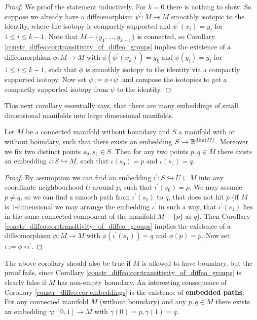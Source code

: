 \begin{proof}
    We proof the statement inductively. For $k=0$ there is nothing to show. So suppose we already have a diffeomorphism $\psi^\prime \colon M \to M$ smoothly isotopic to the identity, where the isotopy is compactly supported and $\psi^\prime(x_i) = y_i$ for $1 \leq i \leq k-1$. Note that $M - \{y_1,\ldots,y_{k-1}\}$ is connected, so Corollary \ref{constr_diffeo:cor:transitivity_of_diffeo_groups} implies the existence of a diffeomorphism $\phi \colon M \to M$ with $\phi(\psi^\prime(x_k)) = y_k$ and $\phi(y_i) = y_i$ for $1 \leq i \leq k-1$, such that $\phi$ is smoothly isotopy to the identity via a compactly supported isotopy. Now set $\psi := \phi \circ \psi^\prime$ and compose the isotopies to get a compactly supported isotopy from $\psi$ to the identity.
\end{proof}

This next corollary essentially says, that there are many embeddings of small dimensional manifolds into large dimensional manifolds.

\begin{corollary}
    \label{constr_diffeo:cor:embeddings}
    Let $M$ be a connected manifold without boundary and $S$ a manifold with or without boundary, such that there exists an embedding $S \hookrightarrow \mathbb{R}^{\mathrm{dim}(M)}$. Moreover we fix two distinct points $s_0,s_1 \in S$. Then for any two points $p,q \in M$ there exists an embedding $\iota \colon S \hookrightarrow M$, such that $\iota(s_0) = p$ and $\iota(s_1) = q$.
\end{corollary}

\begin{proof}
    By assumption we can find an embedding $\iota^\prime \colon S \hookrightarrow U \subseteq M$ into any coordinate neighbourhood $U$ around $p$, such that $\iota^\prime(s_0) = p$. We may assume $ p \neq q$, so we can find a smooth path from $\iota^\prime(s_1)$ to $q$, that does not hit $p$ (if $M$ is $1$-dimensional we may arrange the embedding $\iota^\prime$ in such a way, that $\iota^\prime(s_1)$ lies in the same connected component of the manifold $M - \{p\}$ as $q$). Then Corollary \ref{constr_diffeo:cor:transitivity_of_diffeo_groups} implies the existence of a diffeomorphism $\phi \colon M \to M$ with $\phi(\iota^\prime(s_1)) = q$ and $\phi(p) = p$. Now set $\iota := \phi \circ \iota^\prime$.
\end{proof}

The above corollary should also be true if $M$ is allowed to have boundary, but the proof fails, since Corollary \ref{constr_diffeo:cor:transitivity_of_diffeo_groups} is clearly false if $M$ has non-empty boundary. An interesting consequence of Corollary \ref{constr_diffeo:cor:embeddings} is the existence of \textbf{embedded paths}: For any connected manifold $M$ (without boundary) and any $p,q \in M$ there exists an embedding $\gamma \colon [0,1] \to M$ with $\gamma(0) = p, \gamma(1) = q$.


